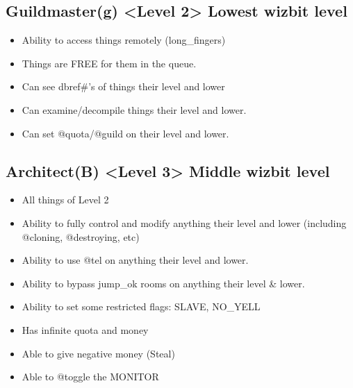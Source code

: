 \documentclass[letterpaper,10pt,english]{sphinxmanual}
\begin{document}
\subsection{Guildmaster(g) \textless{}Level 2\textgreater{} \sphinxhyphen{} Lowest wizbit level}
\label{\detokenize{29-setup:guildmaster-g-level-2-lowest-wizbit-level}}\begin{itemize}
\item {} 
\sphinxAtStartPar
Ability to access things remotely (long\_fingers)

\item {} 
\sphinxAtStartPar
Things are FREE for them in the queue.

\item {} 
\sphinxAtStartPar
Can see dbref\#’s of things their level and lower

\item {} 
\sphinxAtStartPar
Can examine/decompile things their level and lower.

\item {} 
\sphinxAtStartPar
Can set @quota/@guild on their level and lower.

\end{itemize}


\subsection{Architect(B) \textless{}Level 3\textgreater{} \sphinxhyphen{} Middle wizbit level}
\label{\detokenize{29-setup:architect-b-level-3-middle-wizbit-level}}\begin{itemize}
\item {} 
\sphinxAtStartPar
All things of Level 2

\item {} 
\sphinxAtStartPar
Ability to fully control and modify anything their level and
lower (including @cloning, @destroying, etc)

\item {} 
\sphinxAtStartPar
Ability to use @tel on anything their level and lower.

\item {} 
\sphinxAtStartPar
Ability to bypass jump\_ok rooms on anything their level \& lower.

\item {} 
\sphinxAtStartPar
Ability to set some restricted flags: SLAVE, NO\_YELL

\item {} 
\sphinxAtStartPar
Has infinite quota and money

\item {} 
\sphinxAtStartPar
Able to give negative money (Steal)

\item {} 
\sphinxAtStartPar
Able to @toggle the MONITOR

\end{itemize}
\end{document}
